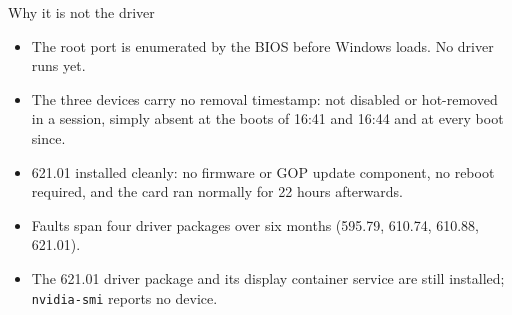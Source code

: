 \documentclass[aspectratio=169,11pt]{beamer}
\begin{document}
\begin{frame}{Why it is not the driver}
  \begin{itemize}\setlength{\itemsep}{0.25em}
    \item The root port is enumerated by the BIOS before Windows loads. No driver runs yet.
    \item The three devices carry no removal timestamp: not disabled or hot-removed in a
      session, simply absent at the boots of 16:41 and 16:44 and at every boot since.
    \item 621.01 installed cleanly: no firmware or GOP update component, no reboot required,
      and the card ran normally for 22 hours afterwards.
    \item Faults span four driver packages over six months (595.79, 610.74, 610.88, 621.01).
    \item The 621.01 driver package and its display container service are still installed;
      \texttt{nvidia-smi} reports no device.
  \end{itemize}
\end{frame}
\end{document}
